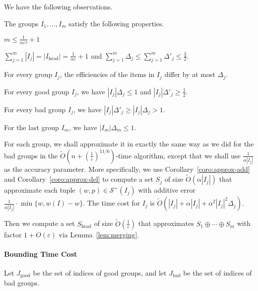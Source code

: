\documentclass[a4paper,UKenglish,cleveref, autoref, thm-restate, pdfa]{lipics-v2021}
\newcommand{\eps}{\varepsilon}
\renewcommand{\leq}{\leqslant}
\renewcommand{\geq}{\geqslant}
\begin{document}
We have the following observations.
\begin{observation}\label{obs:group-property}
The groups $I_1, \ldots, I_m$ satisfy the following properties.
\begin{romanenumerate}
    \item $m \leq \frac{1}{\alpha\eps\tau} + 1$

    \item $\sum_{j=1}^{m}|I_j| = |I_{\mathrm{head}}| = \frac{1}{\alpha\eps} + 1$ and $\sum_{j=1}^{m}\Delta_j \leq \sum_{j=1}^{m}\Delta'_j \leq \frac{3}{2}$.

    \item For every group $I_j$, the efficiencies of the items in $I_j$ differ by at most $\Delta_j$.

    \item For every good group $I_j$, we have $|I_j|\Delta_j \leq 1$ and $|I_j|\Delta'_j \geq \frac{1}{2}$.

    \item For every bad group $I_j$, we have $|I_j|\Delta'_j \geq |I_j|\Delta_j > 1$.

    \item For the last group $I_m$, we have $|I_m|\Delta_m \leq 1$.
\end{romanenumerate}
\end{observation}

For each group, we shall approximate it in exactly the same way as we did for the bad groups in the $\tilde{O}(n + (\frac{1}{\eps})^{11/6})$-time algorithm, except that we shall use $\frac{1}{\alpha|I_j|}$ as the accuracy parameter. More specifically, we use Corollary~\ref{coro:approx-add} and Corollary~\ref{coro:approx-del} to compute a set $S_j$ of size $\tilde{O}(\alpha|I_j|)$ that approximate each tuple $(w, p) \in \mathcal{S}^+(I_j)$ with additive error $\frac{1}{\alpha|I_j|} \cdot \min\{w, w(I) - w\}$. The time cost for $I_j$ is $\tilde{O}(|I_j| + \alpha|I_j| + \alpha^2|I_j|^2\Delta_j)$.

Then we compute a set $S_{\mathrm{head}}$ of size $\tilde{O}(\frac{1}{\eps})$ that approximates $S_1 \oplus \cdots \oplus S_m$ with factor $1+O(\eps)$ via Lemma~\ref{lem:merging}. 

\paragraph*{Bounding Time Cost}
Let $J_{\mathrm{good}}$ be the set of indices of good groups, and let $J_{\mathrm{bad}}$ be the set of indices of bad groups.
 
\end{document}
